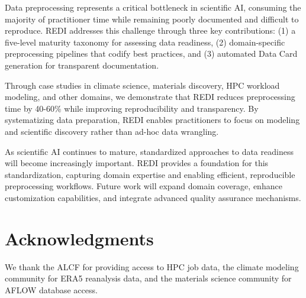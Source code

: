 \documentclass[11pt,letterpaper,twocolumn]{article}
\begin{document}
Data preprocessing represents a critical bottleneck in scientific AI, consuming the majority of practitioner time while remaining poorly documented and difficult to reproduce. REDI addresses this challenge through three key contributions: (1) a five-level maturity taxonomy for assessing data readiness, (2) domain-specific preprocessing pipelines that codify best practices, and (3) automated Data Card generation for transparent documentation.

Through case studies in climate science, materials discovery, HPC workload modeling, and other domains, we demonstrate that REDI reduces preprocessing time by 40-60\% while improving reproducibility and transparency. By systematizing data preparation, REDI enables practitioners to focus on modeling and scientific discovery rather than ad-hoc data wrangling.

As scientific AI continues to mature, standardized approaches to data readiness will become increasingly important. REDI provides a foundation for this standardization, capturing domain expertise and enabling efficient, reproducible preprocessing workflows. Future work will expand domain coverage, enhance customization capabilities, and integrate advanced quality assurance mechanisms.

\section*{Acknowledgments}

We thank the ALCF for providing access to HPC job data, the climate modeling community for ERA5 reanalysis data, and the materials science community for AFLOW database access.
\end{document}
